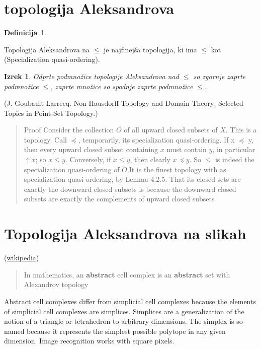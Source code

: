 \documentclass[a4paper, 12pt]{book}
\newtheorem{definition}{Definicija}[section]
\newtheorem{theorem}{Izrek}[section]
\begin{document}
\section{topologija Aleksandrova}
\begin{definition}
  
\end{definition}
Topologija Aleksandrova na $\leq$ je najfinejša topologija,
ki ima $\leq$ kot (Specialization quasi-ordering).
\begin{theorem}
  Odprte podmnožice topologije Aleksandrova nad $\leq$ so zgornje zaprte podmnožice $\leq$, zaprte množice so spodnje zaprte podmnožice $\leq$.
\end{theorem}
(J. Goubault-Larrecq. Non-Hausdorff Topology and Domain Theory: Selected Topics in Point-Set Topology.)
\begin{quote}
  Proof Consider the collection $O$ of all upward closed subsets of $X$. This is a
  topology. Call $\preceq$, temporarily, its specialization quasi-ordering. If x $\preceq$ y, then
  every upward closed subset containing $x$ must contain $y$, in particular $\uparrow x$; so
  $x \leq y$. Conversely, if $x \leq y$, then clearly $x \preceq y$.
  So $\leq$ is indeed the specialization quasi-ordering of $O$.It is the finest topology with  as specialization
  quasi-ordering, by Lemma 4.2.5. That its closed sets are exactly the downward closed subsets
  is because the downward closed subsets are exactly the complements of upward closed subsets
\end{quote}
\section{Topologija Aleksandrova na slikah}
(\href{https://en.wikipedia.org/wiki/Abstract_cell_complex}{wikipedia})
\begin{quote}
  In mathematics, an \textbf{abstract} cell complex is an \textbf{abstract} set with Alexandrov topology
\end{quote}
Abstract cell complexes differ from simplicial cell complexes because the
elements of simplicial cell complexes are simplices. Simplices are
a generalization of the notion of a triangle or tetrahedron to arbitrary dimensions. 
The simplex is so-named because it represents the simplest possible polytope in any given dimension.
Image recognition works with square pixels.
\end{document}
